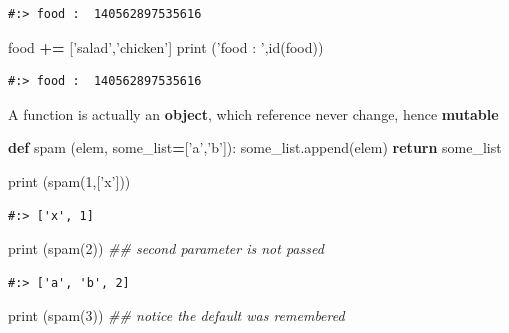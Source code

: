 \documentclass[
]{book}
\newenvironment{Shaded}{\begin{snugshade}}{\end{snugshade}}
\newcommand{\BuiltInTok}[1]{#1}
\newcommand{\CommentTok}[1]{\textcolor[rgb]{0.37,0.37,0.37}{\textit{#1}}}
\newcommand{\ControlFlowTok}[1]{\textcolor[rgb]{0.27,0.27,0.27}{\textbf{#1}}}
\newcommand{\DecValTok}[1]{\textcolor[rgb]{0.06,0.06,0.06}{#1}}
\newcommand{\KeywordTok}[1]{\textcolor[rgb]{0.27,0.27,0.27}{\textbf{#1}}}
\newcommand{\NormalTok}[1]{#1}
\newcommand{\OperatorTok}[1]{\textcolor[rgb]{0.43,0.43,0.43}{\textbf{#1}}}
\newcommand{\StringTok}[1]{\textcolor[rgb]{0.5,0.5,0.5}{#1}}
\begin{document}
\begin{verbatim}
#:> food :  140562897535616
\end{verbatim}

\begin{Shaded}
\begin{Highlighting}[]
\NormalTok{food }\OperatorTok{+=}\NormalTok{ [}\StringTok{'salad'}\NormalTok{,}\StringTok{'chicken'}\NormalTok{]}
\BuiltInTok{print}\NormalTok{ (}\StringTok{'food : '}\NormalTok{,}\BuiltInTok{id}\NormalTok{(food))}
\end{Highlighting}
\end{Shaded}

\begin{verbatim}
#:> food :  140562897535616
\end{verbatim}

A function is actually an \textbf{object}, which reference never change, hence \textbf{mutable}

\begin{Shaded}
\begin{Highlighting}[]
\KeywordTok{def}\NormalTok{ spam (elem, some_list}\OperatorTok{=}\NormalTok{[}\StringTok{'a'}\NormalTok{,}\StringTok{'b'}\NormalTok{]):}
\NormalTok{    some_list.append(elem)}
    \ControlFlowTok{return}\NormalTok{ some_list}

\BuiltInTok{print}\NormalTok{ (spam(}\DecValTok{1}\NormalTok{,[}\StringTok{'x'}\NormalTok{]))}
\end{Highlighting}
\end{Shaded}

\begin{verbatim}
#:> ['x', 1]
\end{verbatim}

\begin{Shaded}
\begin{Highlighting}[]
\BuiltInTok{print}\NormalTok{ (spam(}\DecValTok{2}\NormalTok{)) }\CommentTok{## second parameter is not passed}
\end{Highlighting}
\end{Shaded}

\begin{verbatim}
#:> ['a', 'b', 2]
\end{verbatim}

\begin{Shaded}
\begin{Highlighting}[]
\BuiltInTok{print}\NormalTok{ (spam(}\DecValTok{3}\NormalTok{)) }\CommentTok{##  notice the default was remembered}
\end{Highlighting}
\end{Shaded}
\end{document}
